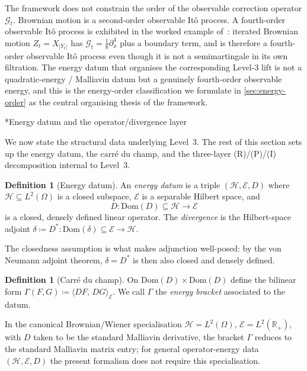 \documentclass[11pt,reqno]{amsart}
\makeatletter
\renewcommand\subsection{\@startsection{subsection}{2}%
  \z@{.7\linespacing}{.5\linespacing}%
  {\normalfont\centering\scshape}}
\theoremstyle{plain}
\theoremstyle{definition}
\newtheorem{definition}[theorem]{Definition}
\theoremstyle{remark}
\newcommand{\R}{\mathbb{R}}
\newcommand{\Hilb}{\mathcal{H}}
\newcommand{\Dom}{\mathrm{Dom}}
\newcommand{\Energy}{\mathcal{E}}
\newcommand{\IBM}{Z}
\newcommand{\Carre}{\Gamma}
\makeatother
\begin{document}
The framework does not constrain the order of the observable
correction operator $\mathcal G_t$. Brownian motion is a second-order
observable It\^o process. A fourth-order observable It\^o process is
exhibited in the worked example of~\cite{IBMPaper}: iterated Brownian
motion $\IBM_t=X_{|Y_t|}$ has $\mathcal G_t=\tfrac18\partial_x^{4}$
plus a boundary term, and is therefore a fourth-order observable
It\^o process even though it is not a semimartingale in its own
filtration. The energy datum that organises the corresponding
Level-3 lift is not a quadratic-energy / Malliavin datum but a
genuinely fourth-order observable energy, and this is the
energy-order classification we formulate in
\cref{sec:energy-order} as the central organising thesis of the
framework.

\subsection*{Energy datum and the operator/divergence layer}

We now state the structural data underlying Level~3. The rest of
this section sets up the energy datum, the carr\'e du champ, and
the three-layer (R)/(P)/(I) decomposition internal to Level~3.

\begin{definition}[Energy datum]\label{def:energy-datum}
An \emph{energy datum} is a triple $(\Hilb,\Energy, D)$ where
$\Hilb\subseteq L^2(\Omega)$ is a closed subspace,
$\Energy$ is a separable Hilbert space, and
\[
  D\colon \Dom(D)\subseteq\Hilb \longrightarrow \Energy
\]
is a closed, densely defined linear operator. The
\emph{divergence} is the Hilbert-space adjoint
$\delta\coloneqq D^{*}\colon\Dom(\delta)\subseteq\Energy\to\Hilb$.
\end{definition}

The closedness assumption is what makes adjunction well-posed: by the
von Neumann adjoint theorem, $\delta=D^{*}$ is then also closed and
densely defined.

\begin{definition}[Carr\'e du champ]\label{def:carre}
On $\Dom(D)\times\Dom(D)$ define the bilinear form
$\Carre(F,G)\coloneqq\langle DF,\,DG\rangle_\Energy$.
We call $\Carre$ the \emph{energy bracket} associated to the datum.
\end{definition}

In the canonical Brownian/Wiener specialisation
$\Hilb=L^2(\Omega)$, $\Energy=L^2(\R_+)$, with $D$ taken to be the
standard Malliavin derivative, the bracket $\Carre$ reduces to the
standard Malliavin matrix entry; for general operator-energy data
$(\Hilb,\Energy,D)$ the present formalism does not require this
specialisation.
\end{document}
